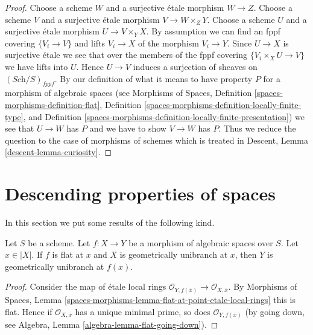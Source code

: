 \begin{proof}
Choose a scheme $W$ and a surjective \'etale morphism $W \to Z$.
Choose a scheme $V$ and a surjective \'etale morphism $V \to W \times_Z Y$.
Choose a scheme $U$ and a surjective \'etale morphism $U \to V \times_Y X$.
By assumption we can find an fppf covering $\{V_i \to V\}$ and
lifts $V_i \to X$ of the morphism $V_i \to Y$. Since $U \to X$ is surjective
\'etale we see that over the members of the fppf covering
$\{V_i \times_X U \to V\}$ we have lifts into $U$. Hence $U \to V$ induces
a surjection of sheaves on $(\textit{Sch}/S)_{fppf}$.
By our definition of what it means to have property $P$ for a
morphism of algebraic spaces (see
Morphisms of Spaces,
Definition \ref{spaces-morphisms-definition-flat},
Definition \ref{spaces-morphisms-definition-locally-finite-type}, and
Definition \ref{spaces-morphisms-definition-locally-finite-presentation})
we see that $U \to W$ has $P$ and we have to show $V \to W$ has $P$.
Thus we reduce the question to the case of morphisms of schemes
which is treated in
Descent, Lemma \ref{descent-lemma-curiosity}.
\end{proof}










\section{Descending properties of spaces}
\label{section-descending-properties-spaces}

\noindent
In this section we put some results of the following kind.

\begin{lemma}
\label{lemma-descend-unibranch}
Let $S$ be a scheme.
Let $f : X \to Y$ be a morphism of algebraic spaces over $S$.
Let $x \in |X|$.
If $f$ is flat at $x$ and $X$ is geometrically unibranch at $x$, then $Y$ is
geometrically unibranch at $f(x)$.
\end{lemma}

\begin{proof}
Consider the map of \'etale local rings
$\mathcal{O}_{Y, f(\overline{x})} \to \mathcal{O}_{X, \overline{x}}$.
By
Morphisms of Spaces, Lemma
\ref{spaces-morphisms-lemma-flat-at-point-etale-local-rings}
this is flat. Hence if $\mathcal{O}_{X, \overline{x}}$ has a unique minimal
prime, so does $\mathcal{O}_{Y, f(\overline{x})}$ (by going down, see
Algebra, Lemma \ref{algebra-lemma-flat-going-down}).
\end{proof}

